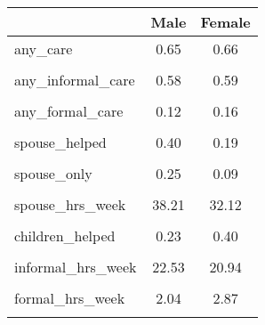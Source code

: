 \begin{tabular}{l*{2}{c}}
\hline\hline
                    &        Male&      Female\\
\hline
any\_care            &        0.65&        0.66\\
                    &            &            \\
[1em]
any\_informal\_care   &        0.58&        0.59\\
                    &            &            \\
[1em]
any\_formal\_care     &        0.12&        0.16\\
                    &            &            \\
[1em]
spouse\_helped       &        0.40&        0.19\\
                    &            &            \\
[1em]
spouse\_only         &        0.25&        0.09\\
                    &            &            \\
[1em]
spouse\_hrs\_week     &       38.21&       32.12\\
                    &            &            \\
[1em]
children\_helped     &        0.23&        0.40\\
                    &            &            \\
[1em]
informal\_hrs\_week   &       22.53&       20.94\\
                    &            &            \\
[1em]
formal\_hrs\_week     &        2.04&        2.87\\
                    &            &            \\
\hline\hline
\end{tabular}
